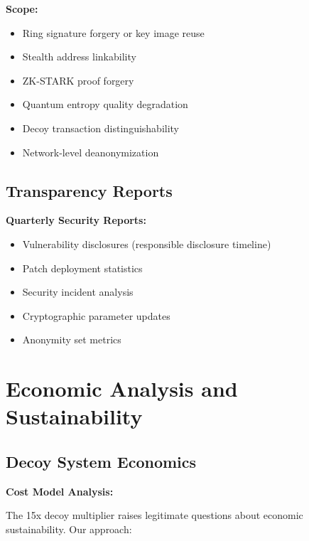 \documentclass[12pt,a4paper]{article}
\begin{document}
\textbf{Scope:}
\begin{itemize}
\item Ring signature forgery or key image reuse
\item Stealth address linkability
\item ZK-STARK proof forgery
\item Quantum entropy quality degradation
\item Decoy transaction distinguishability
\item Network-level deanonymization
\end{itemize}

\subsection{Transparency Reports}

\textbf{Quarterly Security Reports:}
\begin{itemize}
\item Vulnerability disclosures (responsible disclosure timeline)
\item Patch deployment statistics
\item Security incident analysis
\item Cryptographic parameter updates
\item Anonymity set metrics
\end{itemize}

\section{Economic Analysis and Sustainability}

\subsection{Decoy System Economics}

\textbf{Cost Model Analysis:}

The 15x decoy multiplier raises legitimate questions about economic sustainability. Our approach:
\end{document}
